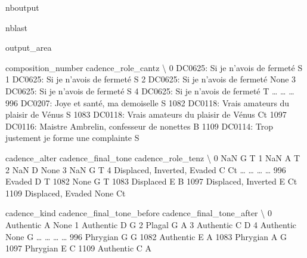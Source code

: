 \documentclass[letterpaper,10pt,english]{sphinxmanual}
\begin{document}
\begin{sphinxuseclass}{nboutput}
\begin{sphinxuseclass}{nblast}
{\begin{sphinxuseclass}{output_area}
\begin{sphinxuseclass}{}
\begin{sphinxVerbatim}[commandchars=\\\{\}]
                                    composition\_number cadence\_role\_cantz  \textbackslash{}
0                     DC0625: Si je n'avois de fermeté                  S
1                     DC0625: Si je n'avois de fermeté                  S
2                     DC0625: Si je n'avois de fermeté               None
3                     DC0625: Si je n'avois de fermeté                  S
4                     DC0625: Si je n'avois de fermeté                  T
{\ldots}                                                {\ldots}                {\ldots}
996               DC0207: Joye et santé, ma demoiselle                  S
1082        DC0118: Vrais amateurs du plaisir de Vénus                  S
1083        DC0118: Vrais amateurs du plaisir de Vénus                 Ct
1097  DC0116: Maistre Ambrelin, confesseur de nonettes                  B
1109    DC0114: Trop justement je forme une complainte                  S

                    cadence\_alter cadence\_final\_tone cadence\_role\_tenz  \textbackslash{}
0                             NaN                  G                 T
1                             NaN                  A                 T
2                             NaN                  D              None
3                             NaN                  G                 T
4     Displaced, Inverted, Evaded                  C                Ct
{\ldots}                           {\ldots}                {\ldots}               {\ldots}
996                        Evaded                  D                 T
1082                         None                  G                 T
1083                    Displaced                  E                 B
1097          Displaced, Inverted                  E                Ct
1109            Displaced, Evaded               None                Ct

     cadence\_kind cadence\_final\_tone\_before cadence\_final\_tone\_after  \textbackslash{}
0       Authentic                         A                     None
1       Authentic                         D                        G
2          Plagal                         G                        A
3       Authentic                         C                        D
4       Authentic                      None                        G
{\ldots}           {\ldots}                       {\ldots}                      {\ldots}
996      Phrygian                         G                        G
1082    Authentic                         E                        A
1083     Phrygian                         A                        G
1097     Phrygian                         E                        C
1109    Authentic                         C                        A


\end{sphinxVerbatim}
\end{sphinxuseclass}
\end{sphinxuseclass}}
\end{sphinxuseclass}
\end{sphinxuseclass}
\end{document}
